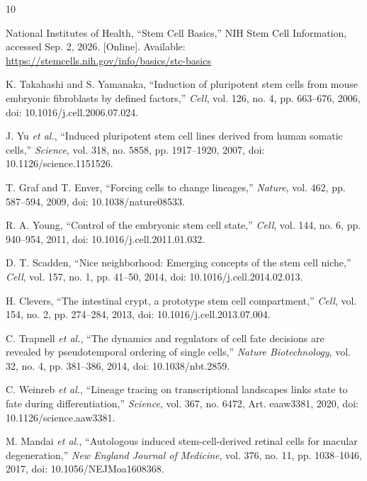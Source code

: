 \documentclass[10pt,conference]{IEEEtran}
\begin{document}
\begin{thebibliography}{10}

National Institutes of Health, ``Stem Cell Basics,'' NIH Stem Cell Information, accessed Sep. 2, 2026. [Online]. Available: \url{https://stemcells.nih.gov/info/basics/stc-basics}

K. Takahashi and S. Yamanaka, ``Induction of pluripotent stem cells from mouse embryonic fibroblasts by defined factors,'' \emph{Cell}, vol. 126, no. 4, pp. 663--676, 2006, doi: 10.1016/j.cell.2006.07.024.

J. Yu \emph{et al.}, ``Induced pluripotent stem cell lines derived from human somatic cells,'' \emph{Science}, vol. 318, no. 5858, pp. 1917--1920, 2007, doi: 10.1126/science.1151526.

T. Graf and T. Enver, ``Forcing cells to change lineages,'' \emph{Nature}, vol. 462, pp. 587--594, 2009, doi: 10.1038/nature08533.

R. A. Young, ``Control of the embryonic stem cell state,'' \emph{Cell}, vol. 144, no. 6, pp. 940--954, 2011, doi: 10.1016/j.cell.2011.01.032.

D. T. Scadden, ``Nice neighborhood: Emerging concepts of the stem cell niche,'' \emph{Cell}, vol. 157, no. 1, pp. 41--50, 2014, doi: 10.1016/j.cell.2014.02.013.

H. Clevers, ``The intestinal crypt, a prototype stem cell compartment,'' \emph{Cell}, vol. 154, no. 2, pp. 274--284, 2013, doi: 10.1016/j.cell.2013.07.004.

C. Trapnell \emph{et al.}, ``The dynamics and regulators of cell fate decisions are revealed by pseudotemporal ordering of single cells,'' \emph{Nature Biotechnology}, vol. 32, no. 4, pp. 381--386, 2014, doi: 10.1038/nbt.2859.

C. Weinreb \emph{et al.}, ``Lineage tracing on transcriptional landscapes links state to fate during differentiation,'' \emph{Science}, vol. 367, no. 6472, Art. eaaw3381, 2020, doi: 10.1126/science.aaw3381.

M. Mandai \emph{et al.}, ``Autologous induced stem-cell-derived retinal cells for macular degeneration,'' \emph{New England Journal of Medicine}, vol. 376, no. 11, pp. 1038--1046, 2017, doi: 10.1056/NEJMoa1608368.

\end{thebibliography}
\end{document}
